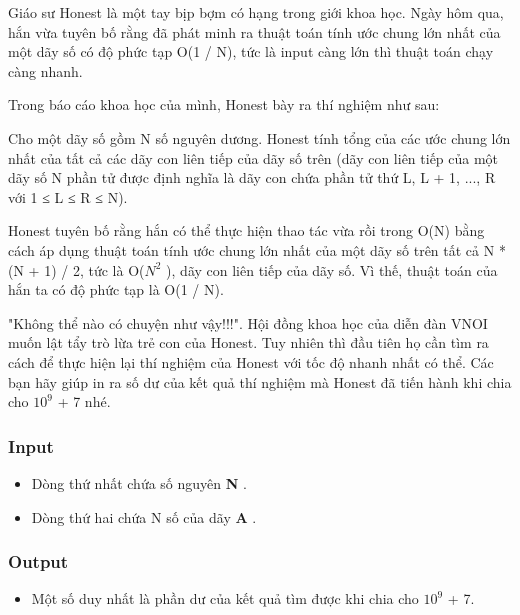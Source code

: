 



   Giáo sư Honest là một tay bịp bợm có hạng trong giới khoa học. Ngày hôm qua, hắn vừa tuyên bố rằng đã phát minh ra thuật toán tính ước chung lớn nhất của một dãy số có độ phức tạp O(1 / N), tức là input càng lớn thì thuật toán chạy càng nhanh.  

   Trong báo cáo khoa học của mình, Honest bày ra thí nghiệm như sau:  

Cho một dãy số gồm N số nguyên dương. Honest tính tổng của các ước chung lớn nhất của tất cả các dãy con liên tiếp của dãy số trên (dãy con liên tiếp của một dãy số N phần tử được định nghĩa là dãy con chứa phần tử thứ L, L + 1, ..., R với 1 ≤ L ≤ R ≤ N).

   Honest tuyên bố rằng hắn có thể thực hiện thao tác vừa rồi trong O(N) bằng cách áp dụng thuật toán tính ước chung lớn nhất của một dãy số trên tất cả N * (N + 1) / 2, tức là O($N^{2}$   ), dãy con liên tiếp của dãy số. Vì thế, thuật toán của hắn ta có độ phức tạp là O(1 / N).  

   "Không thể nào có chuyện như vậy!!!". Hội đồng khoa học của diễn đàn VNOI muốn lật tẩy trò lừa trẻ con của Honest. Tuy nhiên thì đầu tiên họ cần tìm ra cách để thực hiện lại thí nghiệm của Honest với tốc độ nhanh nhất có thể. Các bạn hãy giúp in ra số dư của kết quả thí nghiệm mà Honest đã tiến hành khi chia cho $10^{9}$   + 7 nhé.  

\subsubsection{   Input  }
\begin{itemize}
	\item     Dòng thứ nhất chứa số nguyên    \textbf{     N    }    .   
	\item     Dòng thứ hai chứa N số của dãy    \textbf{     A    }    .   
\end{itemize}

\subsubsection{   Output  }
\begin{itemize}
	\item     Một số duy nhất là phần dư của kết quả tìm được khi chia cho $10^{9}$    + 7.   
\end{itemize}

